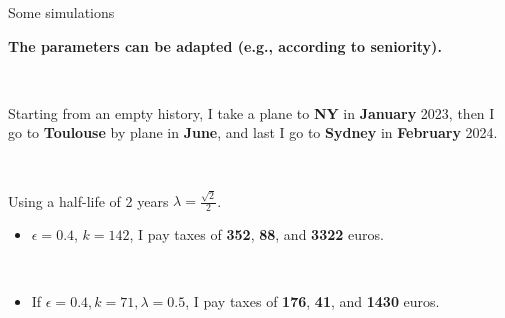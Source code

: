 \documentclass[french, english]{beamer}
\begin{document}
\begin{frame}{Some simulations}

    \textbf{The parameters can be adapted (e.g., according to seniority).}
    
    \
    
    Starting from an empty history, I take a plane to \textbf{NY} in \textbf{January} 2023, then I go to \textbf{Toulouse} by plane in \textbf{June}, and  last I go to \textbf{Sydney} in \textbf{February} 2024. 
    
    \
    
    Using a half-life of 2 years $\lambda = \frac{\sqrt{2}}{2}$.
    \begin{itemize}
    \item $\epsilon = 0.4$, $k=142$, I pay taxes of \textbf{352}, \textbf{88}, and \textbf{3322} euros.
    \end{itemize}
    
    \
    
    \begin{itemize}
    \item If $\epsilon = 0.4, k = 71, \lambda = 0.5$, I pay taxes of \textbf{176}, \textbf{41}, and \textbf{1430} euros. 
    \end{itemize}
\end{frame}
\end{document}

